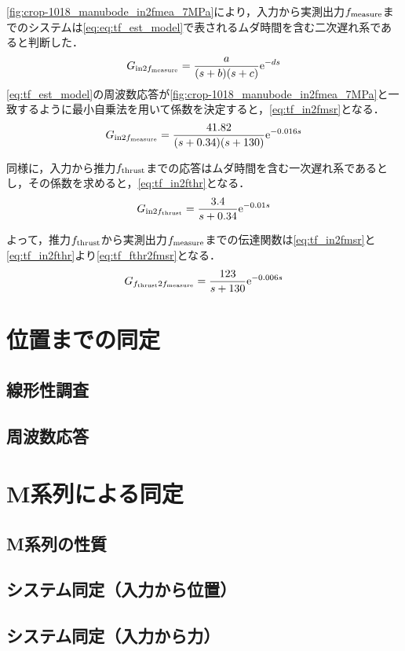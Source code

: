 \figname\ref{fig:crop-1018_manubode_in2fmea_7MPa}により，入力から実測出力$f_\mathrm{measure}$までのシステムは\eqnname\ref{eq:eq:tf_est_model}で表されるムダ時間を含む二次遅れ系であると判断した．
\begin{align}
    \label{eq:tf_est_model}
    G_{\mathrm{in}2f_\mathrm{measure}} = \frac{a}{(s+b)(s+c)}\mathrm{e}^{-ds}
\end{align}
\eqnname\ref{eq:tf_est_model}の周波数応答が\figname\ref{fig:crop-1018_manubode_in2fmea_7MPa}と一致するように最小自乗法を用いて係数を決定すると，\eqnname\ref{eq:tf_in2fmsr}となる．
\begin{align}
    \label{eq:tf_in2fmsr}
    G_{\mathrm{in}2f_\mathrm{measure}} = \frac{41.82}{(s+0.34)(s+130)}\mathrm{e}^{-0.016s}
\end{align}

同様に，入力から推力$f_\mathrm{thrust}$までの応答はムダ時間を含む一次遅れ系であるとし，その係数を求めると，\eqnname\ref{eq:tf_in2fthr}となる．
\begin{align}
    \label{eq:tf_in2fthr}
    G_{\mathrm{in}2f_\mathrm{thrust}} = \frac{3.4}{s+0.34}\mathrm{e}^{-0.01s}
\end{align}

よって，推力$f_\mathrm{thrust}$から実測出力$f_\mathrm{measure}$までの伝達関数は\eqnname\ref{eq:tf_in2fmsr}と\eqnname\ref{eq:tf_in2fthr}より\eqnname\ref{eq:tf_fthr2fmsr}となる．
\begin{align}
    \label{eq:tf_fthr2fmsr}
    G_{f_\mathrm{thrust}2f_\mathrm{measure}} = \frac{123}{s+130}\mathrm{e}^{-0.006s}
\end{align}
\section{位置までの同定}
\subsection{線形性調査}
\subsection{周波数応答}
\section{M系列による同定}
\subsection{M系列の性質}
\subsection{システム同定（入力から位置）}
\subsection{システム同定（入力から力）}

